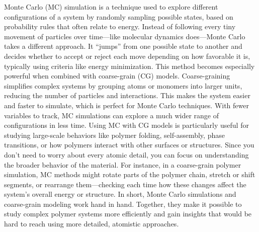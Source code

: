 \documentclass[12pt]{article}
\begin{document}
\begin{flushleft}
Monte Carlo (MC) simulation is a technique used to explore different configurations of a system by randomly sampling possible states, based on probability rules that often relate to energy. Instead of following every tiny movement of particles over time—like molecular dynamics does—Monte Carlo takes a different approach. It “jumps” from one possible state to another and decides whether to accept or reject each move depending on how favorable it is, typically using criteria like energy minimization.
This method becomes especially powerful when combined with coarse-grain (CG) models. Coarse-graining simplifies complex systems by grouping atoms or monomers into larger units, reducing the number of particles and interactions. This makes the system easier and faster to simulate, which is perfect for Monte Carlo techniques. With fewer variables to track, MC simulations can explore a much wider range of configurations in less time.
Using MC with CG models is particularly useful for studying large-scale behaviors like polymer folding, self-assembly, phase transitions, or how polymers interact with other surfaces or structures. Since you don’t need to worry about every atomic detail, you can focus on understanding the broader behavior of the material. For instance, in a coarse-grain polymer simulation, MC methods might rotate parts of the polymer chain, stretch or shift segments, or rearrange them—checking each time how these changes affect the system’s overall energy or structure.
In short, Monte Carlo simulations and coarse-grain modeling work hand in hand. Together, they make it possible to study complex polymer systems more efficiently and gain insights that would be hard to reach using more detailed, atomistic approaches.

\end{flushleft}
\end{document}
